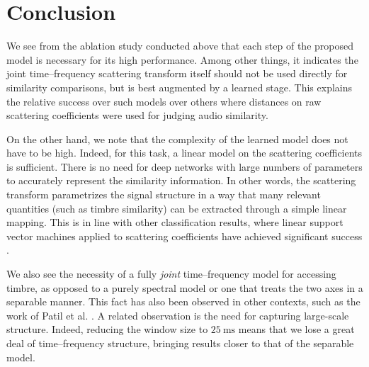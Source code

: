 \documentclass{bmcart}
\newcommand{\nmu}{}
\begin{document}


\section*{\nmu Conclusion}
\label{sec:conclusion}

We see from the ablation study conducted above that each step of the proposed model is necessary for its high performance.
Among other things, it indicates the joint time--frequency scattering transform itself should not be used directly for similarity comparisons, but is best augmented by a learned stage.
This explains the relative success over such models \cite{lostanlen2018jasmp,lostanlen2018extended} over others where distances on raw scattering coefficients were used for judging audio similarity.

On the other hand, we note that the complexity of the learned model does not have to be high.
Indeed, for this task, a linear model on the scattering coefficients is sufficient.
There is no need for deep networks with large numbers of parameters to accurately represent the similarity information.
In other words, the scattering transform parametrizes the signal structure in a way that many relevant quantities (such as timbre similarity) can be extracted through a simple linear mapping.
This is in line with other classification results, where linear support vector machines applied to scattering coefficients have achieved significant success \cite{anden2015mlsp,anden2019tsp}.

We also see the necessity of a fully \emph{joint} time--frequency model for accessing timbre, as opposed to a purely spectral model or one that treats the two axes in a separable manner.
This fact has also been observed in other contexts, such as the work of Patil et al. \cite{patil2012ploscompbiol}.
A related observation is the need for capturing large-scale structure.
Indeed, reducing the window size to $25~\mathrm{ms}$ means that we lose a great deal of time--frequency structure, bringing results closer to that of the separable model.
\end{document}
